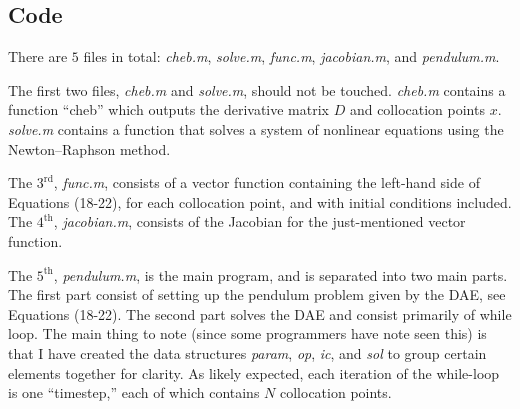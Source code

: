\documentclass[11pt]{amsdtx}
\newcommand{\rd}{\mathrm{rd}}
\newcommand{\nth}{\mathrm{th}}
\begin{document}
	
\subsection{Code}

There are $5$ files in total: \textit{cheb.m}, \textit{solve.m}, \textit{func.m}, \textit{jacobian.m}, and \textit{pendulum.m}.

The first two files, \textit{cheb.m} and \textit{solve.m}, should not be touched. \textit{cheb.m} contains a function ``cheb'' which outputs the derivative matrix $D$ and collocation points $x$.  \textit{solve.m} contains a function that solves a system of nonlinear equations using the Newton--Raphson method.

The $3^\rd$, \textit{func.m}, consists of a vector function containing the left-hand side of Equations (18-22), for each collocation point, and with initial conditions included.  The $4^\nth$, \textit{jacobian.m}, consists of the Jacobian for the just-mentioned vector function.

The $5^\nth$, \textit{pendulum.m}, is the main program, and is separated into two main parts.  The first part consist of setting up the pendulum problem given by the DAE, see Equations (18-22).  The second part solves the DAE and consist primarily of while loop. The main thing to note (since some programmers have note seen this) is that I have created the data structures \textit{param}, \textit{op}, \textit{ic}, and \textit{sol} to group certain elements together for clarity.  As likely expected, each iteration of the while-loop is one ``timestep,'' each of which contains $N$ collocation points. 


%
%
%

\end{document}
